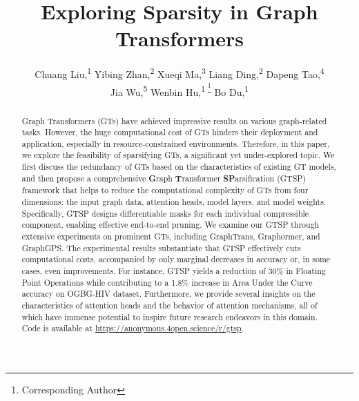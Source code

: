 \documentclass[letterpaper]{article} %
\title{Exploring Sparsity in Graph Transformers}
\author {
   Chuang Liu,\textsuperscript{\rm 1}
   Yibing Zhan,\textsuperscript{\rm 2}
   Xueqi Ma,\textsuperscript{\rm 3}
   Liang Ding,\textsuperscript{\rm 2}
   Dapeng Tao,\textsuperscript{\rm 4}\\
   Jia Wu,\textsuperscript{\rm 5}
   Wenbin Hu,\textsuperscript{\rm 1 \thanks{Corresponding Author}}
   Bo Du,\textsuperscript{\rm 1 }
}
\begin{document}
\maketitle

\begin{abstract}
Graph Transformers (GTs) have achieved impressive results on various graph-related tasks. However, the huge computational cost of GTs hinders their deployment and application, especially in resource-constrained environments. Therefore, in this paper, we explore the feasibility of sparsifying GTs, a significant yet under-explored topic. We first discuss the redundancy of GTs based on the characteristics of existing GT models, and then propose a comprehensive \textbf{G}raph \textbf{T}ransformer \textbf{SP}arsification (GTSP) framework that helps to reduce the computational complexity of GTs from four dimensions: the input graph data, attention heads, model layers, and model weights. Specifically, GTSP designs differentiable masks for each individual compressible component, enabling effective end-to-end pruning. We examine our GTSP through extensive experiments on prominent GTs, including GraphTrans, Graphormer, and GraphGPS. The experimental results substantiate that GTSP effectively cuts computational costs, accompanied by only marginal decreases in accuracy or, in some cases, even improvements. For instance, GTSP yields a reduction of 30\% in Floating Point Operations while contributing to a 1.8\% increase in Area Under the Curve accuracy on OGBG-HIV dataset. Furthermore, we provide several insights on the characteristics of attention heads and the behavior of attention mechanisms, all of which have immense potential to inspire future research endeavors in this domain. Code is available at \url{https://anonymous.4open.science/r/gtsp}. 
\end{abstract}



\end{document}
